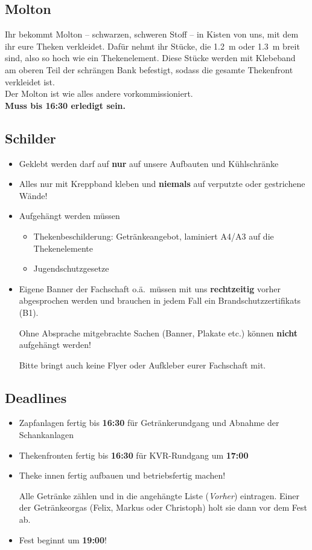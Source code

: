 \subsection{Molton}
Ihr bekommt Molton -- schwarzen, schweren Stoff -- in Kisten von uns, mit dem ihr eure Theken verkleidet. Dafür nehmt ihr Stücke, die \SI{1.2}{\meter} oder \SI{1.3}{\meter} breit sind, also so hoch wie ein Thekenelement. Diese Stücke werden mit Klebeband am oberen Teil der schrängen Bank befestigt, sodass die gesamte Thekenfront verkleidet ist.\\
Der Molton ist wie alles andere vorkommissioniert.\\
\textbf{Muss bis 16:30 erledigt sein.}
\subsection{Schilder}
\begin{itemize}
  \item Geklebt werden darf auf \textbf{nur} auf unsere Aufbauten und Kühlschränke
  \item Alles nur mit Kreppband kleben und \textbf{niemals} auf verputzte oder gestrichene Wände!
  \item Aufgehängt werden müssen
    \begin{itemize}
      \item Thekenbeschilderung: Getränkeangebot, laminiert A4/A3 auf die Thekenelemente
      \item Jugendschutzgesetze
    \end{itemize}
  \item Eigene Banner der Fachschaft o.ä.\ müssen mit uns \textbf{rechtzeitig} vorher abgesprochen werden und brauchen in jedem Fall ein Brandschutzzertifikats (B1).

    Ohne Absprache mitgebrachte Sachen (Banner, Plakate etc.) können \textbf{nicht} aufgehängt werden!

    Bitte bringt auch keine Flyer oder Aufkleber eurer Fachschaft mit.
\end{itemize}
\subsection{Deadlines}
\begin{itemize}
  \item Zapfanlagen fertig bis \textbf{16:30} für Getränkerundgang und Abnahme der Schankanlagen
  \item Thekenfronten fertig bis \textbf{16:30} für KVR-Rundgang um \textbf{17:00}
  \item Theke innen fertig aufbauen und betriebsfertig machen!

    Alle Getränke zählen und in die angehängte Liste (\emph{Vorher}) eintragen. Einer der Getränkeorgas (Felix, Markus oder Christoph) holt sie dann vor dem Fest ab.
  \item \Large{Fest beginnt um \textbf{19:00}!}
\end{itemize}
\FloatBarrier
